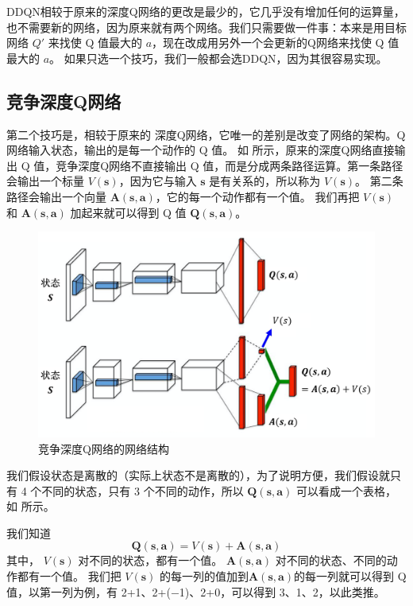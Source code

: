 DDQN相较于原来的深度Q网络的更改是最少的，它几乎没有增加任何的运算量，也不需要新的网络，因为原来就有两个网络。我们只需要做一件事：本来是用目标网络 $Q'$ 来找使 Q 值最大的 $a$，现在改成用另外一个会更新的Q网络来找使 Q 值最大的 $a$。
如果只选一个技巧，我们一般都会选DDQN，因为其很容易实现。

\subsection{竞争深度Q网络} 
第二个技巧是，相较于原来的 深度Q网络，它唯一的差别是改变了网络的架构。Q网络输入状态，输出的是每一个动作的 Q 值。
如 所示，原来的深度Q网络直接输出 Q 值，竞争深度Q网络不直接输出 Q 值，而是分成两条路径运算。第一条路径会输出一个标量 $V(\boldsymbol{s})$，因为它与输入 $\boldsymbol{s}$ 是有关系的，所以称为 $V(\boldsymbol{s})$。
第二条路径会输出一个向量 $\boldsymbol{A}(\boldsymbol{s},\boldsymbol{a})$，它的每一个动作都有一个值。
我们再把 $V(\boldsymbol{s})$ 和 $\boldsymbol{A}(\boldsymbol{s},\boldsymbol{a})$ 加起来就可以得到 Q 值 $\boldsymbol{Q}(\boldsymbol{s},\boldsymbol{a})$。

\begin{figure}[htb]
    \centering
    \includegraphics[width=0.5\linewidth]{res/ch7/7.4}
    \caption{竞争深度Q网络的网络结构}
    \label{fig:dueling_dqn_1}
\end{figure}

我们假设状态是离散的（实际上状态不是离散的），为了说明方便，我们假设就只有 4 个不同的状态，只有 3 个不同的动作，所以 $\boldsymbol{Q}(\boldsymbol{s},\boldsymbol{a})$  可以看成一个表格，如 所示。

我们知道
$$
\boldsymbol{Q}(\boldsymbol{s},\boldsymbol{a}) = V(\boldsymbol{s}) + \boldsymbol{A}(\boldsymbol{s},\boldsymbol{a})
$$
其中，
$V(\boldsymbol{s})$ 对不同的状态，都有一个值。 
$\boldsymbol{A}(\boldsymbol{s},\boldsymbol{a})$ 对不同的状态、不同的动作都有一个值。
我们把 $V(\boldsymbol{s})$ 的每一列的值加到$\boldsymbol{A}(\boldsymbol{s},\boldsymbol{a})$的每一列就可以得到 Q 值，以第一列为例，有 2+1、2+($-$1)、2+0，可以得到 3、1、2，以此类推。

